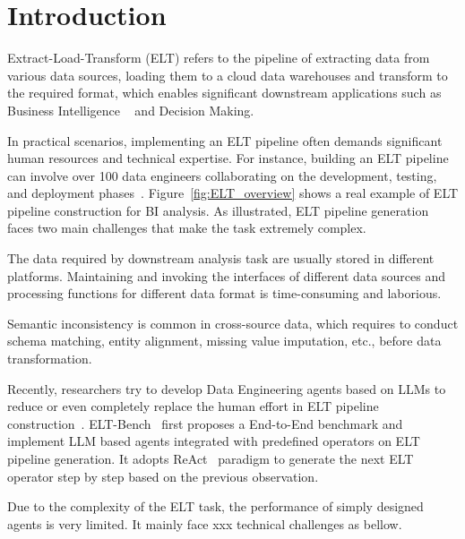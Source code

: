 \section{Introduction}
\label{sec:intro}



Extract-Load-Transform (ELT) refers to the pipeline of extracting data from various data sources, loading them to a cloud data warehouses and transform to the required format, which enables significant downstream applications such as Business Intelligence ~\cite{weng2024datalab} and Decision Making. 

 In practical scenarios, implementing an ELT pipeline often demands significant human resources and technical expertise. For instance, building an ELT pipeline can involve over 100 data engineers collaborating on the development, testing, and deployment phases~\cite{redditETL}. Figure~\ref{fig:ELT_overview} shows a real example of ELT pipeline construction for BI analysis. As illustrated, ELT pipeline generation faces two main challenges that make the task extremely complex. 

 The data required by downstream analysis task are usually stored in different platforms. Maintaining and invoking the interfaces of different data sources and processing functions for different data format is time-consuming and laborious.

 Semantic inconsistency is common in cross-source data, which requires to conduct schema matching, entity alignment, missing value imputation, etc., before data transformation.

Recently, researchers try to develop Data Engineering agents based on LLMs to reduce or even completely replace the human effort in ELT pipeline construction~\cite{jin2025elt}. ELT-Bench~\cite{jin2025elt} first proposes a End-to-End benchmark and implement LLM based agents integrated with predefined operators on ELT pipeline generation. It adopts ReAct~\cite{yao2022react} paradigm to generate the next ELT operator step by step based on the previous observation.

 Due to the complexity of the ELT task, the performance of simply designed agents is very limited. It mainly face xxx technical challenges as bellow.

